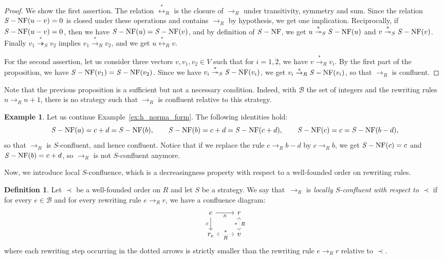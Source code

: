 \documentclass[10pt]{easychair}
\theoremstyle{definition}
\newtheorem{definition}[theorem]{Definition}
\newtheorem{example}[theorem]{Example}
\newcommand\basis{\mathscr{B}}
\newcommand\rewR{\to_R}
\newcommand\transR{\overset{*}{\to}_R}
\newcommand\transS{\overset{*}{\twoheadrightarrow}_S}
\newcommand\equivR{\overset{*}{\leftrightarrow}_R}
\DeclareMathOperator{\SNF}{{\it S}-NF}
\begin{document}
\begin{proof}
  We show the first assertion. The relation $\equivR$ is the closure of
  $\rewR$ under transitivity, symmetry and sum. Since the relation
  $\SNF(u-v)=0$ is closed under these operations and contains $\rewR$ by
  hypothesis, we get one implication. Reciprocally, if $\SNF(u-v)=0$,
  then we have $\SNF(u)=\SNF(v)$, and by definition of $\SNF$, we get
  $u\transS\SNF(u)$ and $v\transS\SNF(v)$. Finally $v_1\transS v_2$
  implies $v_1\transR v_2$, and we get $u\equivR v$.

  For the second assertion, let us consider three vectors
  $v,v_1,v_2\in V$ such that for $i=1,2$, we have $v\transR v_i$. By the
  first part of the proposition, we have $\SNF(v_1)=\SNF(v_2)$. Since we
  have $v_i\transS\SNF(v_i)$, we get $v_i\transR\SNF(v_i)$, so that
  $\rewR$ is confluent.
\end{proof}
\smallskip

Note that the previous proposition is a sufficient but not a necessary
condition. Indeed, with $\basis$ the set of integers and the rewriting
rules $n\rewR n+1$, there is no strategy such that $\rewR$ is confluent
relative to this strategy.
\smallskip

\begin{example}
  Let us continue Example~\ref{ex:h_norma_form}. The following identities
  hold:
  \[\SNF(a)=c+d=\SNF(b),\qquad\SNF(b)=c+d=\SNF(c+d),\qquad
  \SNF(c)=c=\SNF(b-d),
  \]
  so that $\rewR$ is $S$-confluent, and hence confluent. Notice that if
  we replace the rule $c\rewR b-d$ by $c\rewR b$, we get $\SNF(c)=c$ and
  $\SNF(b)=c+d$, so $\rewR$ is not $S$-confluent anymore. 
\end{example}
\smallskip

Now, we introduce local $S$-confluence, which is a decreasingness
property with respect to a well-founded order on rewriting rules.
\smallskip

\begin{definition}\label{def:decreasingness_property}
  Let $\prec$ be a well-founded order on $R$ and let $S$ be a strategy.
  We say that~$\rewR$ is \emph{locally $S$-confluent with respect to}
  $\prec$ if for every $e\in\basis$ and for every rewriting rule
  $e\rewR r$, we have a confluence diagram:
  \[\begin{tikzcd}
  e\ar[r, "_R"']\ar[d, "_S"'] & r\ar[d, leftrightarrow, dotted, "*"', "R"]\\
  r_e\ar[r, leftrightarrow, dotted, "*", "R"'] & v
  \end{tikzcd}\]
  where each rewriting step occurring in the dotted arrows is strictly smaller
  than the rewriting rule $e\rewR r$ relative to $\prec$.
\end{definition}
\smallskip
\end{document}
